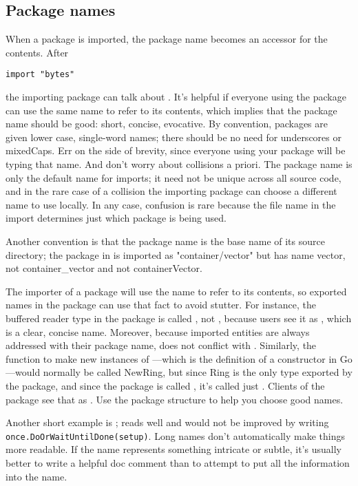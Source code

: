 \subsection{Package names}
When a package is imported, the package name becomes an accessor for the
contents. After
\begin{lstlisting}
import "bytes"
\end{lstlisting}
the importing package can talk about . It's helpful if
everyone using the package can use the same name to refer to its
contents, which implies that the package name should be good: short,
concise, evocative. By convention, packages are given lower case,
single-word names; there should be no need for underscores or mixedCaps.
Err on the side of brevity, since everyone using your package will be
typing that name. And don't worry about collisions a priori. The package
name is only the default name for imports; it need not be unique across
all source code, and in the rare case of a collision the importing
package can choose a different name to use locally. In any case,
confusion is rare because the file name in the import determines just
which package is being used.

Another convention is that the package name is the base name of its
source directory; the package in  is imported as
"container/vector" but has name vector, not container\_vector and not
containerVector.

The importer of a package will use the name to refer to its contents, so 
exported names in the package can use that fact to avoid
stutter. For instance, the buffered reader type in the  package is
called , not , because users see it as
,
which is a clear, concise name. Moreover, because imported entities are
always addressed with their package name,  does not conflict
with . Similarly, the function to make new instances of
---which is the definition of a constructor in Go---would normally
be called NewRing, but since Ring is the only type exported by the
package, and since the package is called , it's called
just .
Clients of the package see that as . Use the package structure
to help you choose good names.

Another short example is ;  reads well and would
not be improved by writing \lstinline{once.DoOrWaitUntilDone(setup)}. Long names
don't automatically make things more readable. If the name represents
something intricate or subtle, it's usually better to write a helpful
doc comment than to attempt to put all the information into the name.

